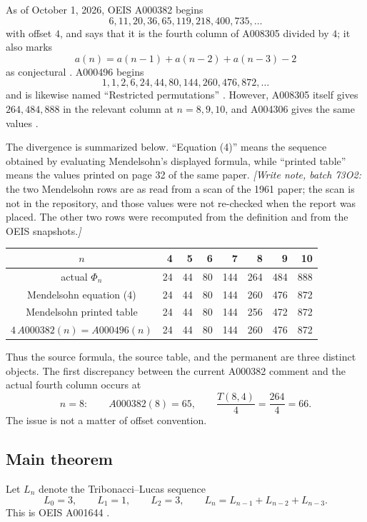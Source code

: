 \documentclass[11pt,letterpaper]{article}
\numberwithin{equation}{section}
\theoremstyle{definition}
\begin{document}
As of October 1, 2026, OEIS A000382 begins
\[
 6,11,20,36,65,119,218,400,735,\dots
\]
with offset $4$, and says that it is the fourth column of A008305 divided by
$4$; it also marks
\[
 a(n)=a(n-1)+a(n-2)+a(n-3)-2
\]
as conjectural \cite{oeisA000382}.  A000496 begins
\[
 1,1,2,6,24,44,80,144,260,476,872,\dots
\]
and is likewise named ``Restricted permutations'' \cite{oeisA000496}.
However, A008305 itself gives $264,484,888$ in the relevant column at
$n=8,9,10$, and A004306 gives the same values
\cite{oeisA008305,oeisA004306}.

The divergence is summarized below.  ``Equation (4)'' means the sequence
obtained by evaluating Mendelsohn's displayed formula, while ``printed table''
means the values printed on page 32 of the same paper.  \emph{[Write note,
batch 73O2:} the two Mendelsohn rows are as read from a scan of the 1961
paper; the scan is not in the repository, and those values were not
re-checked when the report was placed.  The other two rows were recomputed
from the definition and from the OEIS snapshots.\emph{]}

\begin{center}
\begin{tabular}{c@{\quad}rrrrrrr}
\toprule
$n$ & 4 & 5 & 6 & 7 & 8 & 9 & 10\\
\midrule
actual $\Phi_n$ & 24 & 44 & 80 & 144 & 264 & 484 & 888\\
Mendelsohn equation (4) & 24 & 44 & 80 & 144 & 260 & 476 & 872\\
Mendelsohn printed table & 24 & 44 & 80 & 144 & 256 & 472 & 872\\
$4\,A000382(n)=A000496(n)$ & 24 & 44 & 80 & 144 & 260 & 476 & 872\\
\bottomrule
\end{tabular}
\end{center}

Thus the source formula, the source table, and the permanent are three distinct
objects.  The first discrepancy between the current A000382 comment and the
actual fourth column occurs at
\[
  n=8:\qquad A000382(8)=65,
  \qquad \frac{T(8,4)}4=\frac{264}{4}=66.
\]
The issue is not a matter of offset convention.

\subsection{Main theorem}

Let $L_n$ denote the Tribonacci--Lucas sequence
\begin{equation}\label{wdc:eq:Lucas-def}
  L_0=3,\qquad L_1=1,\qquad L_2=3,
  \qquad L_n=L_{n-1}+L_{n-2}+L_{n-3}.
\end{equation}
This is OEIS A001644 \cite{oeisA001644}.
\end{document}
